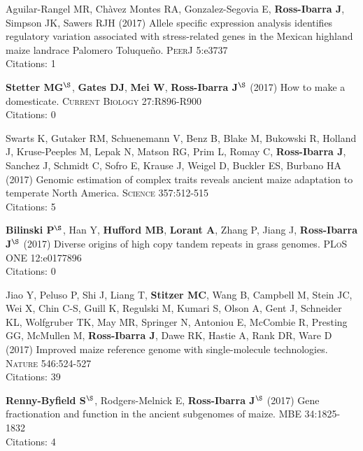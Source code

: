 \documentclass[letterpaper,10pt]{article}
\begin{document}
\begin{etaremune}
\item Aguilar-Rangel MR, Ch\`{a}vez Montes RA,  Gonzalez-Segovia E, \textbf{Ross-Ibarra J}, Simpson JK, Sawers RJH (2017) Allele specific expression analysis identifies regulatory variation associated with stress-related genes in the Mexican highland maize landrace Palomero Toluque\~{n}o. \textsc{PeerJ} 5:e3737
\\Citations: 1\\

\item   {\bf Stetter MG}$^\S$, {\bf Gates DJ}, {\bf Mei W}, {\bf Ross-Ibarra J}$^\S$ (2017) How to make a domesticate. \textsc{Current Biology} 27:R896-R900
\\Citations: 0\\

\item Swarts K, Gutaker RM,   Schuenemann V,  Benz B,  Blake M, Bukowski R, Holland J, Kruse-Peeples M, Lepak N, Matson RG, Prim L, Romay C, {\bf Ross-Ibarra J}, Sanchez J, Schmidt C,  Sofro E,  Krause J,  Weigel D,  Buckler ES,  Burbano HA (2017) Genomic estimation of complex traits reveals ancient maize adaptation to temperate North America. \textsc{Science} 357:512-515
\\Citations: 5\\

\item {\bf Bilinski P}$^\S$, Han Y, {\bf Hufford MB}, {\bf Lorant A}, Zhang P, Jiang J, {\bf Ross-Ibarra J}$^\S$ (2017) Diverse origins of high copy tandem repeats in grass genomes. \textsc{PLoS ONE} 12:e0177896
\\Citations: 0\\

\item  Jiao Y, Peluso P,  Shi J,  Liang T, {\bf Stitzer MC}, Wang B,  Campbell M, Stein JC,  Wei X,  Chin C-S,  Guill K,  Regulski M,  Kumari S,  Olson A,  Gent J, Schneider KL,  Wolfgruber TK, May MR, Springer N,  Antoniou E,  McCombie R, Presting GG,  McMullen M, {\bf Ross-Ibarra J}, Dawe RK,  Hastie A, Rank DR, Ware D (2017) Improved maize reference genome with single-molecule technologies. \textsc{Nature}  546:524-527
\\Citations: 39\\

\item  {\bf Renny-Byfield S}$^\S$, Rodgers-Melnick E, {\bf Ross-Ibarra J}$^\S$ (2017) Gene fractionation and function in the ancient subgenomes of maize. \textsc{MBE} 34:1825-1832
\\Citations: 4\\


\end{etaremune}
\end{document}
